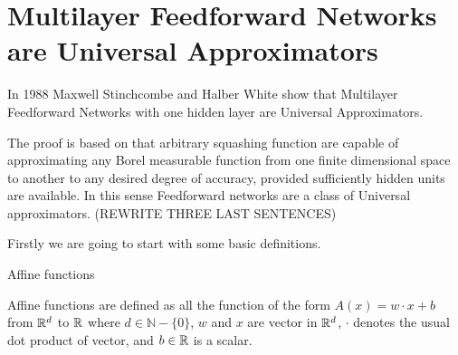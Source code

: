  


    
\section{Multilayer Feedforward Networks are Universal Approximators}

In 1988 Maxwell Stinchcombe and Halber White show that Multilayer
Feedforward Networks with one hidden layer are Universal Approximators.  

The proof is based on that arbitrary squashing function are capable of approximating
any Borel measurable function from one finite dimensional space to another to any desired 
degree of accuracy, provided sufficiently hidden units are available. In this sense 
Feedforward networks are a class of Universal approximators. 
(REWRITE THREE LAST SENTENCES)

Firstly we are going to start with some basic definitions. 

\begin{definition}Affine functions  

    Affine functions are defined as all the 
    function of the form $A(x) = w \cdot x + b$ 
    from $\mathbb{R} ^d$ to $\mathbb{R}$
    where $d \in \mathbb{N} - \{ 0 \}$, $w$ and $x$  are vector in $\mathbb{R}^d$,  
    $\cdot$ 
    denotes the usual dot product of vector, and $b \in \mathbb{R}$ is a scalar.  
    
\end{definition}
    


